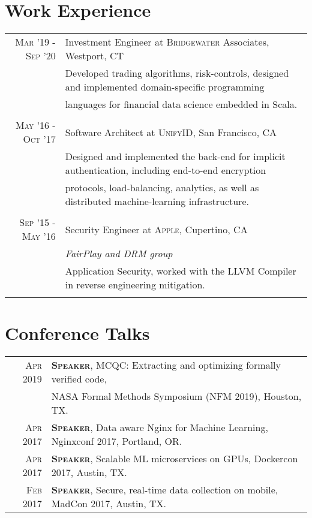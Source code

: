 \documentclass[lettersize,11pt]{article}
\begin{document}
\section{Work Experience}
\begin{tabular}{rl}
\textsc{Mar} '19 - \textsc{Sep} '20 & Investment Engineer at \textsc{Bridgewater} Associates, Westport, CT\\
&\footnotesize{Developed trading algorithms, risk-controls, designed and implemented domain-specific programming}\\
&\footnotesize{languages for financial data science embedded in Scala.}\\\multicolumn{2}{c}{} \\

\textsc{May} '16 - \textsc{Oct} '17 & Software Architect at \textsc{UnifyID}, San Francisco, CA\\
&\footnotesize{Designed and implemented the back-end for implicit authentication, including end-to-end encryption}\\
&\footnotesize{protocols, load-balancing, analytics, as well as distributed machine-learning infrastructure.}\\\multicolumn{2}{c}{} \\

\textsc{Sep} '15 - \textsc{May} '16 & Security Engineer at \textsc{Apple}, Cupertino, CA \\&\emph{FairPlay and DRM group}\\
&\footnotesize{Application Security, worked with the LLVM Compiler in reverse engineering mitigation.}\\\multicolumn{2}{c}{} \\
\end{tabular}


\section{Conference Talks}
\begin{tabular}{rl}
    \textsc{Apr} 2019 & \textsc{\textbf{Speaker}}, MCQC: Extracting and optimizing formally verified code, \\
     &                                              NASA Formal Methods Symposium (NFM 2019), Houston, TX. \\
    \textsc{Apr} 2017 & \textsc{\textbf{Speaker}}, Data aware Nginx for Machine Learning, Nginxconf 2017, Portland, OR. \\
    \textsc{Apr} 2017 & \textsc{\textbf{Speaker}}, Scalable ML microservices on GPUs, Dockercon 2017, Austin, TX. \\
    \textsc{Feb} 2017 & \textsc{\textbf{Speaker}}, Secure, real-time data collection on mobile, MadCon 2017, Austin, TX. \\
\end{tabular}
\end{document}

